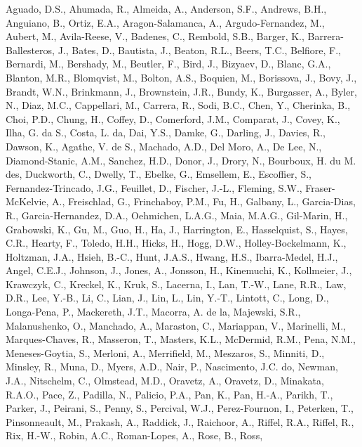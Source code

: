 \documentclass[]{elsarticle} %
\newlength{\cslhangindent}
\newlength{\cslentryspacingunit} %
\newenvironment{CSLReferences}[2] %
 {%
  \setlength{\parindent}{0pt}
  \ifodd #1
  \let\oldpar\par
  \def\par{\hangindent=\cslhangindent\oldpar}
  \fi
  \setlength{\parskip}{#2\cslentryspacingunit}
 }%
 {}
\begin{document}
\hypertarget{refs}{}
\begin{CSLReferences}{1}{0}
\leavevmode{}%
Aguado, D.S., Ahumada, R., Almeida, A., Anderson, S.F., Andrews, B.H.,
Anguiano, B., Ortiz, E.A., Aragon-Salamanca, A., Argudo-Fernandez, M.,
Aubert, M., Avila-Reese, V., Badenes, C., Rembold, S.B., Barger, K.,
Barrera-Ballesteros, J., Bates, D., Bautista, J., Beaton, R.L., Beers,
T.C., Belfiore, F., Bernardi, M., Bershady, M., Beutler, F., Bird, J.,
Bizyaev, D., Blanc, G.A., Blanton, M.R., Blomqvist, M., Bolton, A.S.,
Boquien, M., Borissova, J., Bovy, J., Brandt, W.N., Brinkmann, J.,
Brownstein, J.R., Bundy, K., Burgasser, A., Byler, N., Diaz, M.C.,
Cappellari, M., Carrera, R., Sodi, B.C., Chen, Y., Cherinka, B., Choi,
P.D., Chung, H., Coffey, D., Comerford, J.M., Comparat, J., Covey, K.,
Ilha, G. da S., Costa, L. da, Dai, Y.S., Damke, G., Darling, J., Davies,
R., Dawson, K., Agathe, V. de S., Machado, A.D., Del Moro, A., De Lee,
N., Diamond-Stanic, A.M., Sanchez, H.D., Donor, J., Drory, N., Bourboux,
H. du M. des, Duckworth, C., Dwelly, T., Ebelke, G., Emsellem, E.,
Escoffier, S., Fernandez-Trincado, J.G., Feuillet, D., Fischer, J.-L.,
Fleming, S.W., Fraser-McKelvie, A., Freischlad, G., Frinchaboy, P.M.,
Fu, H., Galbany, L., Garcia-Dias, R., Garcia-Hernandez, D.A., Oehmichen,
L.A.G., Maia, M.A.G., Gil-Marin, H., Grabowski, K., Gu, M., Guo, H., Ha,
J., Harrington, E., Hasselquist, S., Hayes, C.R., Hearty, F., Toledo,
H.H., Hicks, H., Hogg, D.W., Holley-Bockelmann, K., Holtzman, J.A.,
Hsieh, B.-C., Hunt, J.A.S., Hwang, H.S., Ibarra-Medel, H.J., Angel,
C.E.J., Johnson, J., Jones, A., Jonsson, H., Kinemuchi, K., Kollmeier,
J., Krawczyk, C., Kreckel, K., Kruk, S., Lacerna, I., Lan, T.-W., Lane,
R.R., Law, D.R., Lee, Y.-B., Li, C., Lian, J., Lin, L., Lin, Y.-T.,
Lintott, C., Long, D., Longa-Pena, P., Mackereth, J.T., Macorra, A. de
la, Majewski, S.R., Malanushenko, O., Manchado, A., Maraston, C.,
Mariappan, V., Marinelli, M., Marques-Chaves, R., Masseron, T., Masters,
K.L., McDermid, R.M., Pena, N.M., Meneses-Goytia, S., Merloni, A.,
Merrifield, M., Meszaros, S., Minniti, D., Minsley, R., Muna, D., Myers,
A.D., Nair, P., Nascimento, J.C. do, Newman, J.A., Nitschelm, C.,
Olmstead, M.D., Oravetz, A., Oravetz, D., Minakata, R.A.O., Pace, Z.,
Padilla, N., Palicio, P.A., Pan, K., Pan, H.-A., Parikh, T., Parker, J.,
Peirani, S., Penny, S., Percival, W.J., Perez-Fournon, I., Peterken, T.,
Pinsonneault, M., Prakash, A., Raddick, J., Raichoor, A., Riffel, R.A.,
Riffel, R., Rix, H.-W., Robin, A.C., Roman-Lopes, A., Rose, B., Ross,

\end{CSLReferences}
\end{document}
